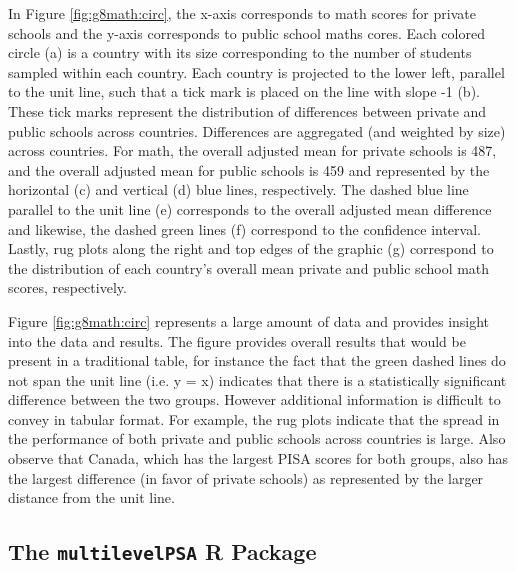 \documentclass[letterpaper,12p,twoside]{article} %
\begin{document}
In Figure \ref{fig:g8math:circ}, the x-axis corresponds to math scores for private schools and the y-axis corresponds to public school maths cores. Each colored circle (a) is a country with its size corresponding to the number of students sampled within each country. Each country is projected to the lower left, parallel to the unit line, such that a tick mark is placed on the line with slope -1 (b). These tick marks represent the distribution of differences between private and public schools across countries. Differences are aggregated (and weighted by size) across countries. For math, the overall adjusted mean for private schools is 487, and the overall adjusted mean for public schools is 459 and represented by the horizontal (c) and vertical (d) blue lines, respectively. The dashed blue line parallel to the unit line (e) corresponds to the overall adjusted mean difference and likewise, the dashed green lines (f) correspond to the confidence interval. Lastly, rug plots along the right and top edges of the graphic (g) correspond to the distribution of each country's overall mean private and public school math scores, respectively.

Figure \ref{fig:g8math:circ} represents a large amount of data and provides insight into the data and results. The figure provides overall results that would be present in a traditional table, for instance the fact that the green dashed lines do not span the unit line (i.e. y = x) indicates that there is a statistically significant difference between the two groups. However additional information is difficult to convey in tabular format. For example, the rug plots indicate that the spread in the performance of both private and public schools across countries is large. Also observe that Canada, which has the largest PISA scores for both groups, also has the largest difference (in favor of private schools) as represented by the larger distance from the unit line.


\subsection{The \texttt{multilevelPSA} R Package}
\end{document}
